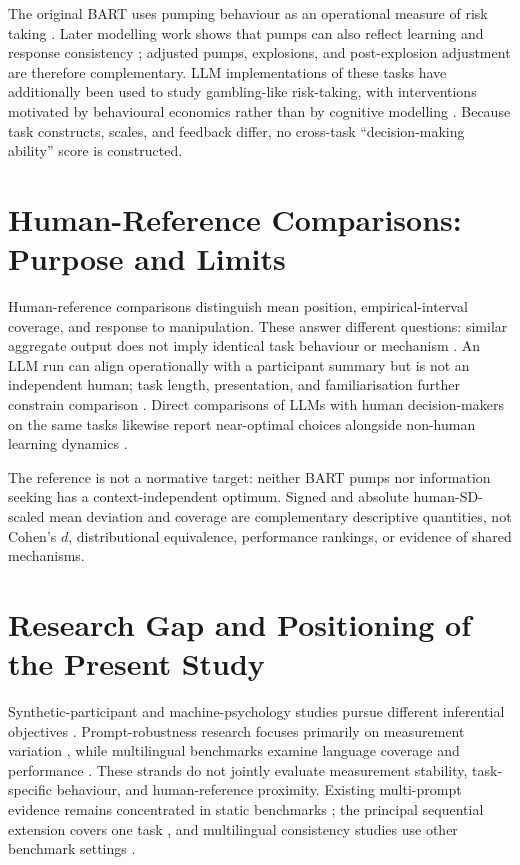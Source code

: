 \documentclass[logo,msc,inf]{infthesis}       %
\begin{document}
The original BART uses pumping behaviour as an operational measure of risk taking \cite{Lejuez2002}. Later modelling work shows that pumps can also reflect learning and response consistency \cite{Wallsten2005BARTModel,VanRavenzwaaij2011BART}; adjusted pumps, explosions, and post-explosion adjustment are therefore complementary. LLM implementations of these tasks have additionally been used to study gambling-like risk-taking, with interventions motivated by behavioural economics rather than by cognitive modelling \cite{Du2025GamblingRisk}. Because task constructs, scales, and feedback differ, no cross-task ``decision-making ability'' score is constructed.

\section{Human-Reference Comparisons: Purpose and Limits}

Human-reference comparisons distinguish mean position, empirical-interval coverage, and response to manipulation. These answer different questions: similar aggregate output does not imply identical task behaviour or mechanism \cite{Lin2025SixFallacies}. An LLM run can align operationally with a participant summary but is not an independent human; task length, presentation, and familiarisation further constrain comparison \cite{Dillion2023ReplaceParticipants,Bisbee2024SyntheticSurveyData}. Direct comparisons of LLMs with human decision-makers on the same tasks likewise report near-optimal choices alongside non-human learning dynamics \cite{Li2025NearOptimal}.

The reference is not a normative target: neither BART pumps nor information seeking has a context-independent optimum. Signed and absolute human-SD-scaled mean deviation and coverage are complementary descriptive quantities, not Cohen's \(d\), distributional equivalence, performance rankings, or evidence of shared mechanisms.

\section{Research Gap and Positioning of the Present Study}

Synthetic-participant and machine-psychology studies pursue different inferential objectives \cite{Dillion2023ReplaceParticipants,Hagendorff2023MachinePsychology}. Prompt-robustness research focuses primarily on measurement variation \cite{Mizrahi2024MultiPrompt}, while multilingual benchmarks examine language coverage and performance \cite{Zhang2023M3Exam}. These strands do not jointly evaluate measurement stability, task-specific behaviour, and human-reference proximity. Existing multi-prompt evidence remains concentrated in static benchmarks \cite{Sclar2024PromptFormatting}; the principal sequential extension covers one task \cite{Loya2023PromptSensitivityDecision}, and multilingual consistency studies use other benchmark settings \cite{Qi2023CrossLingualConsistency}.
\end{document}
